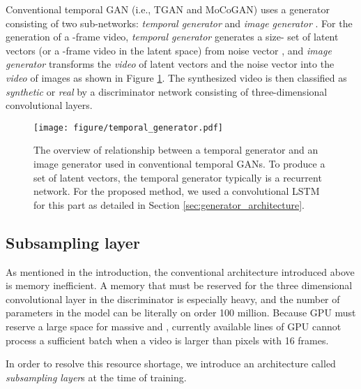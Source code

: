 \documentclass[twocolumn]{svjour3}
\def\Fig#1{Figure \ref{fig:#1}}
\def\Sec#1{Section \ref{sec:#1}}
\begin{document}
Conventional temporal GAN (i.e., TGAN and MoCoGAN) uses a generator consisting of two sub-networks: {\em temporal generator}  and {\em image generator} .
For the generation of a -frame video, {\em temporal generator} generates a size- set of latent vectors (or a -frame video in the latent space)
 from noise vector , and {\em image generator} transforms the \textit{video} of latent vectors and the noise vector into the \textit{video} of images as shown in \Fig{temporal_generator}.
The synthesized video is then classified as \textit{synthetic} or \textit{real} by a discriminator network consisting of three-dimensional convolutional layers.

\begin{figure}[t]
\centering
  \texttt{[image: figure/temporal\_generator.pdf]}
  \caption{The overview of relationship between a temporal generator and an image generator used in conventional temporal GANs. To produce a set of  latent vectors, the temporal generator typically is a recurrent network. For the proposed method, we used a convolutional LSTM for this part as detailed in \Sec{generator_architecture}.}
  \label{fig:temporal_generator}

\end{figure}









\subsection{Subsampling layer}

As mentioned in the introduction, the conventional architecture introduced above is memory inefficient.
A memory that must be reserved for the three dimensional convolutional layer in the discriminator is especially heavy, and the number of parameters in the model can be literally on order 100 million.
Because GPU must reserve a large space for massive  and , currently available lines of GPU cannot process a sufficient batch when a video is larger than  pixels with 16 frames.

In order to resolve this resource shortage, we introduce an architecture called \textit{subsampling layer}s at the time of training.
\end{document}
